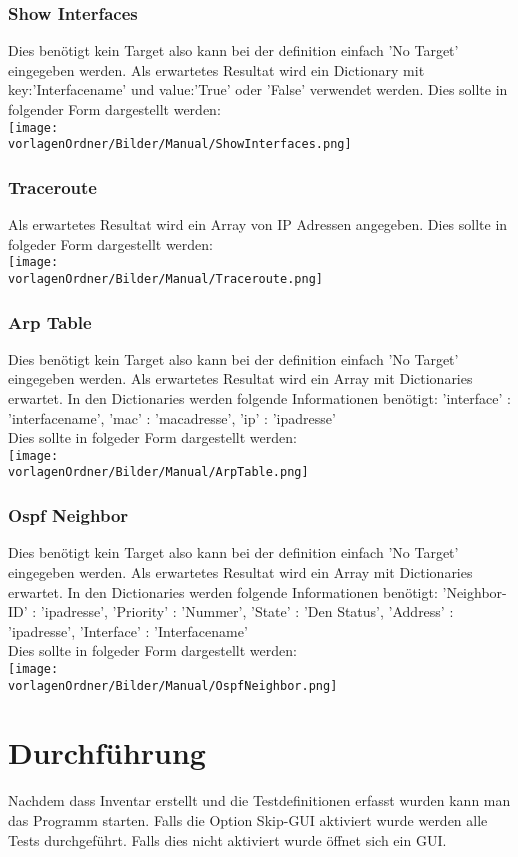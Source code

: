 \documentclass[
	ngerman,
	toc=listof, %
	toc=bibliography, %
	footnotes=multiple, %
	parskip=half, %
	numbers=noendperiod %
]{scrartcl}
\newcommand{\vorlagenOrdner}{../99_Vorlagen} %
\begin{document}
		\subsubsection{Show Interfaces}
			Dies benötigt kein Target also kann bei der definition einfach 'No Target' eingegeben werden.
			Als erwartetes Resultat wird ein Dictionary mit key:'Interfacename' und value:'True' oder 'False' verwendet werden.
			Dies sollte in folgender Form dargestellt werden:\\
			\texttt{[image: \\vorlagenOrdner/Bilder/Manual/ShowInterfaces.png]}
		\subsubsection{Traceroute}
			Als erwartetes Resultat wird ein Array von IP Adressen angegeben.
			Dies sollte in folgeder Form dargestellt werden:\\
			\texttt{[image: \\vorlagenOrdner/Bilder/Manual/Traceroute.png]}
		\subsubsection{Arp Table}
			Dies benötigt kein Target also kann bei der definition einfach 'No Target' eingegeben werden.
			Als erwartetes Resultat wird ein Array mit Dictionaries erwartet. In den Dictionaries werden folgende Informationen benötigt:
			'interface' : 'interfacename', 'mac' : 'macadresse', 'ip' : 'ipadresse'\\
			Dies sollte in folgeder Form dargestellt werden:\\
			\texttt{[image: \\vorlagenOrdner/Bilder/Manual/ArpTable.png]}
		\subsubsection{Ospf Neighbor}
			Dies benötigt kein Target also kann bei der definition einfach 'No Target' eingegeben werden.
			Als erwartetes Resultat wird ein Array mit Dictionaries erwartet. In den Dictionaries werden folgende Informationen benötigt:
			'Neighbor-ID' : 'ipadresse', 'Priority' : 'Nummer', 'State' : 'Den Status', 'Address' : 'ipadresse', 'Interface' : 'Interfacename'\\
			Dies sollte in folgeder Form dargestellt werden:\\
			\texttt{[image: \\vorlagenOrdner/Bilder/Manual/OspfNeighbor.png]}

\section{Durchführung}
	Nachdem dass Inventar erstellt und die Testdefinitionen erfasst wurden kann man das Programm starten.
	Falls die Option Skip-GUI aktiviert wurde werden alle Tests durchgeführt. Falls dies nicht aktiviert wurde
	öffnet sich ein GUI.
\end{document}
